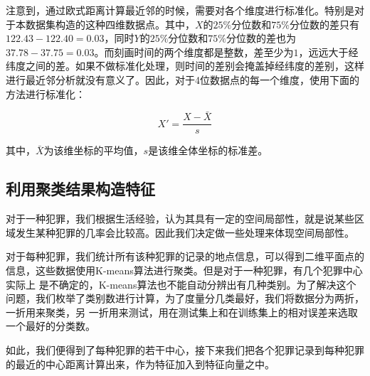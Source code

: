 注意到，通过欧式距离计算最近邻的时候，需要对各个维度进行标准化。特别是对于本数据集构造的这种四维数据点。其中，$X$的$25\%$分位数和$75\%$分位数的差只有$122.43 - 122.40 = 0.03$，同时$Y$的$25\%$分位数和$75\%$分位数的差也为$37.78 - 37.75 = 0.03$。而刻画时间的两个维度都是整数，差至少为$1$，远远大于经纬度之间的差。如果不做标准化处理，则时间的差别会掩盖掉经纬度的差别，这样进行最近邻分析就没有意义了。因此，对于4位数据点的每一个维度，使用下面的方法进行标准化：

\begin{equation*}
    X' = \frac{X - \bar{X}}{s}
\end{equation*}

其中，$\bar{X}$为该维坐标的平均值，$s$是该维全体坐标的标准差。


\subsection{利用聚类结果构造特征}

对于一种犯罪，我们根据生活经验，认为其具有一定的空间局部性，就是说某些区域发生某种犯罪的几率会比较高。因此我们决定做一些处理来体现空间局部性。

对于每种犯罪，我们统计所有该种犯罪的记录的地点信息，可以得到二维平面点的信息，这些数据使用K-means算法进行聚类。但是对于一种犯罪，有几个犯罪中心实际上
是不确定的，K-means算法也不能自动分辨出有几种类别。为了解决这个问题，我们枚举了类别数进行计算，为了度量分几类最好，我们将数据分为两折，一折用来聚类，另
一折用来测试，用在测试集上和在训练集上的相对误差来选取一个最好的分类数。

如此，我们便得到了每种犯罪的若干中心，接下来我们把各个犯罪记录到每种犯罪的最近的中心距离计算出来，作为特征加入到特征向量之中。
